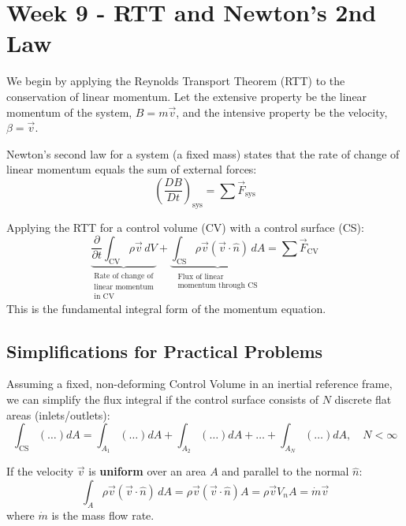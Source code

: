 \section{Week 9 - RTT and Newton's 2nd Law}

We begin by applying the Reynolds Transport Theorem (RTT) to the conservation of linear momentum. Let the extensive property be the linear momentum of the system, $B = m\vec{v}$, and the intensive property be the velocity, $\beta = \vec{v}$.

Newton's second law for a system (a fixed mass) states that the rate of change of linear momentum equals the sum of external forces:
\begin{equation}
    \left( \frac{DB}{Dt} \right)_{\text{sys}} = \sum \vec{F}_{\text{sys}}
\end{equation}

Applying the RTT for a control volume (CV) with a control surface (CS):
\begin{equation}
    \underbrace{\frac{\partial}{\partial t}\int_{\text{CV}}\rho\vec{v}\,dV}_{\substack{\text{Rate of change of} \\ \text{linear momentum} \\ \text{in CV}}} + \underbrace{\int_{\text{CS}}\rho\vec{v}(\vec{v}\cdot\hat{n})\,dA}_{\substack{\text{Flux of linear} \\ \text{momentum through CS}}} = \sum \vec{F}_{\text{CV}}
\end{equation}
This is the fundamental integral form of the momentum equation.

\subsection{Simplifications for Practical Problems}
Assuming a fixed, non-deforming Control Volume in an inertial reference frame, we can simplify the flux integral if the control surface consists of $N$ discrete flat areas (inlets/outlets):
\begin{equation}
    \int_{\text{CS}} (\dots) dA = \int_{A_1} (\dots) dA + \int_{A_2} (\dots) dA + \dots + \int_{A_N} (\dots) dA, \quad N < \infty
\end{equation}

If the velocity $\vec{v}$ is \textbf{uniform} over an area $A$ and parallel to the normal $\hat{n}$:
\begin{equation}
    \int_{A} \rho\vec{v}(\vec{v}\cdot\hat{n})\,dA = \rho\vec{v}(\vec{v}\cdot\hat{n})A = \rho\vec{v}V_n A = \dot{m}\vec{v}
\end{equation}
where $\dot{m}$ is the mass flow rate. 

